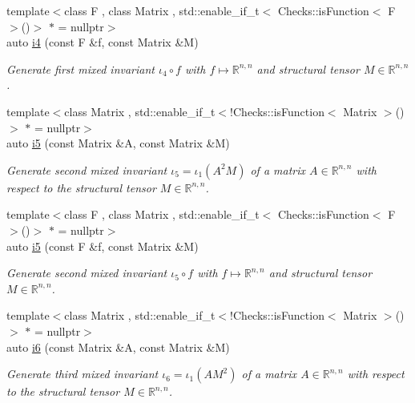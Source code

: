 \begin{DoxyCompactItemize}
{\footnotesize template$<$class F , class Matrix , std\-::enable\-\_\-if\-\_\-t$<$ Checks\-::is\-Function$<$ F $>$()$>$ $\ast$  = nullptr$>$ }\\auto \hyperlink{group__InvariantGroup_ga0df96cdb1e4b8b5a040f2adc97c51100}{i4} (const \-F \&f, const \-Matrix \&\-M)
\begin{DoxyCompactList}\small\item\em \-Generate first mixed invariant $ \iota_4\circ f $ with $f\mapsto\mathbb{R}^{n,n}$ and structural tensor $M\in\mathbb{R}^{n,n}$. \end{DoxyCompactList}\item 
{\footnotesize template$<$class Matrix , std\-::enable\-\_\-if\-\_\-t$<$!\-Checks\-::is\-Function$<$ Matrix $>$()$>$ $\ast$  = nullptr$>$ }\\auto \hyperlink{group__InvariantGroup_gabedc42182203d883278e29fd16b355a0}{i5} (const \-Matrix \&\-A, const \-Matrix \&\-M)
\begin{DoxyCompactList}\small\item\em \-Generate second mixed invariant $ \iota_5=\iota_1(A^2M) $ of a matrix $A\in\mathbb{R}^{n,n}$ with respect to the structural tensor $M\in\mathbb{R}^{n,n}$. \end{DoxyCompactList}\item 
{\footnotesize template$<$class F , class Matrix , std\-::enable\-\_\-if\-\_\-t$<$ Checks\-::is\-Function$<$ F $>$()$>$ $\ast$  = nullptr$>$ }\\auto \hyperlink{group__InvariantGroup_gaed7e47c39d89f2b01e25c992da78b44d}{i5} (const \-F \&f, const \-Matrix \&\-M)
\begin{DoxyCompactList}\small\item\em \-Generate second mixed invariant $ \iota_5\circ f $ with $f\mapsto\mathbb{R}^{n,n}$ and structural tensor $M\in\mathbb{R}^{n,n}$. \end{DoxyCompactList}\item 
{\footnotesize template$<$class Matrix , std\-::enable\-\_\-if\-\_\-t$<$!\-Checks\-::is\-Function$<$ Matrix $>$()$>$ $\ast$  = nullptr$>$ }\\auto \hyperlink{group__InvariantGroup_gad9f0627946667bb052212f65ecdd002b}{i6} (const \-Matrix \&\-A, const \-Matrix \&\-M)
\begin{DoxyCompactList}\small\item\em \-Generate third mixed invariant $ \iota_6=\iota_1(AM^2) $ of a matrix $A\in\mathbb{R}^{n,n}$ with respect to the structural tensor $M\in\mathbb{R}^{n,n}$. \end{DoxyCompactList}\item 

\end{DoxyCompactItemize}
